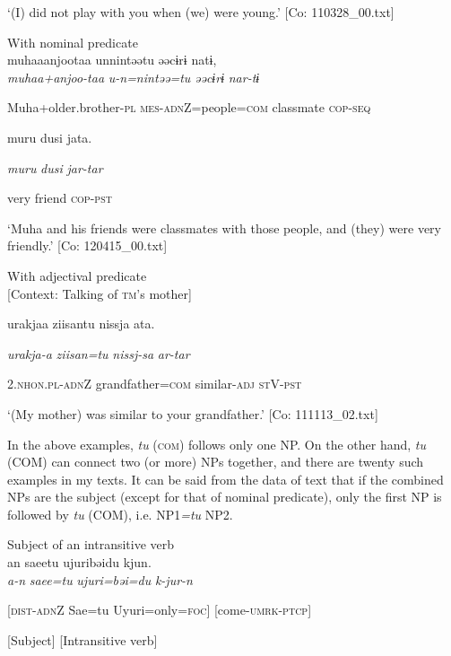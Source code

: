 \glt ‘(I) did not play with you when (we) were young.’ [Co: 110328\_00.txt]
\z

 \ex With nominal predicate\\
{\TM}
\gll  muhaaanjootaa  unnintəətu  əəcɨrɨ  natɨ,\\

      \textit{muhaa+anjoo-taa}  \textit{u-n=nintəə=tu}  \textit{əəcɨrɨ}  \textit{nar-tɨ}

      Muha+older.brother-\textsc{pl}  \textsc{mes}-\textsc{adn}Z=people=\textsc{com}  classmate  \textsc{cop}-\textsc{seq}

      muru  dusi  jata.

      \textit{muru}  \textit{dusi}  \textit{jar-tar}

      very  friend  \textsc{cop}-\textsc{pst}

\glt ‘Muha and his friends were classmates with those people, and (they) were very friendly.’ [Co: 120415\_00.txt]
\z

 \ex With adjectival predicate\\{}
[Context: Talking of \textsc{tm}’s mother]

{\TM}
\gll urakjaa  ziisantu  nissja  ata.

      \textit{urakja-a}  \textit{ziisan=tu}  \textit{nissj-sa}  \textit{ar-tar}

      2.\textsc{nhon}.\textsc{pl}-\textsc{adn}Z  grandfather=\textsc{com}  similar-\textsc{adj}  \textsc{st}V-\textsc{pst}

\glt ‘(My mother) was similar to your grandfather.’ [Co: 111113\_02.txt]
\z

In the above examples, \textit{tu} (\textsc{com}) follows only one NP. On the other hand, \textit{tu} (COM) can connect two (or more) NPs together, and there are twenty such examples in my texts. It can be said from the data of text that if the combined NPs are the subject (except for that of nominal predicate), only the first NP is followed by \textit{tu} (COM), i.e. NP1\textit{=tu} NP2.

\ea\label{ex:6-74}
\ea Subject of an intransitive verb\\
{\TM}
\gll  an  saeetu  ujuribəidu  kjun.\\

      \textit{a-n}  \textit{saee=tu}  \textit{ujuri=bəi=du}  \textit{k-jur-n}

      [\textsc{dist}-\textsc{adn}Z  Sae=tu  Uyuri=only=\textsc{foc}]  [come-\textsc{umrk}-\textsc{ptcp}]

      [Subject]  [Intransitive verb]

